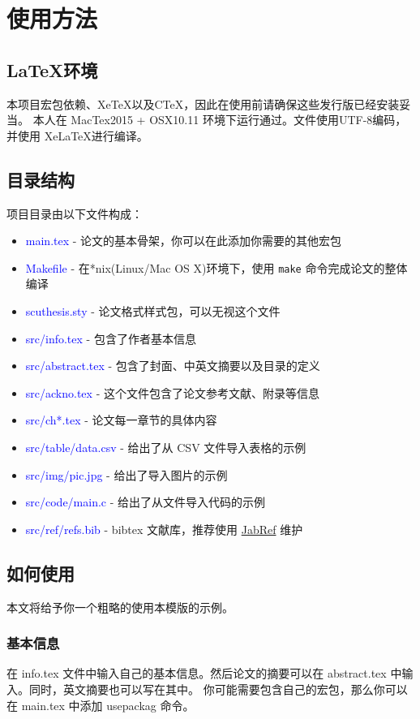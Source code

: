 \chapter{使用方法}
\section{\LaTeX 环境}
本项目宏包依赖\LaTeXe 、Xe\TeX 以及C\TeX ，因此在使用前请确保这些发行版已经安装妥当。
本人在 MacTex2015 + OSX10.11 环境下运行通过。文件使用UTF-8编码，并使用 Xe\LaTeX 进行编译。

\section{目录结构}
项目目录由以下文件构成：
\begin{itemize}
\item \textcolor{blue}{main.tex} - 论文的基本骨架，你可以在此添加你需要的其他宏包
\item \textcolor{blue}{Makefile} - 在*nix(Linux/Mac OS X)环境下，使用 \verb|make| 命令完成论文的整体编译
\item \textcolor{blue}{scuthesis.sty} - 论文格式样式包，可以无视这个文件
\item \textcolor{blue}{src/info.tex} - 包含了作者基本信息
\item \textcolor{blue}{src/abstract.tex} - 包含了封面、中英文摘要以及目录的定义
\item \textcolor{blue}{src/ackno.tex} - 这个文件包含了论文参考文献、附录等信息
\item \textcolor{blue}{src/ch*.tex} - 论文每一章节的具体内容
\item \textcolor{blue}{src/table/data.csv} - 给出了从 CSV 文件导入表格的示例
\item \textcolor{blue}{src/img/pic.jpg} - 给出了导入图片的示例
\item \textcolor{blue}{src/code/main.c} - 给出了从文件导入代码的示例
\item \textcolor{blue}{src/ref/refs.bib} - bibtex 文献库，推荐使用 \href{http://jabref.sourceforge.net/}{JabRef} 维护
\end{itemize}

\section{如何使用}
本文将给予你一个粗略的使用本模版的示例。
\subsection{基本信息}
在 info.tex 文件中输入自己的基本信息。然后论文的摘要可以在 abstract.tex 中输入。同时，英文摘要也可以写在其中。
你可能需要包含自己的宏包，那么你可以在 main.tex 中添加 usepackag 命令。

